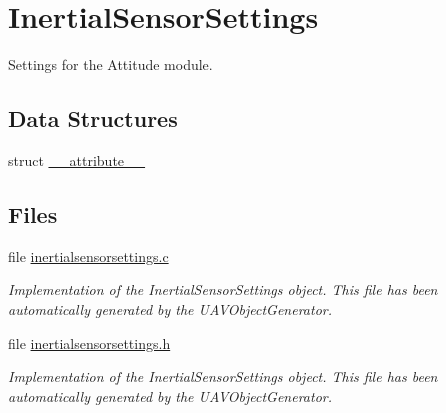 \hypertarget{group___inertial_sensor_settings}{\section{\-Inertial\-Sensor\-Settings}
\label{group___inertial_sensor_settings}
}


\-Settings for the \-Attitude module.  


\subsection*{\-Data \-Structures}
\begin{DoxyCompactItemize}
\item 
struct \hyperlink{struct____attribute____}{\-\_\-\-\_\-attribute\-\_\-\-\_\-}
\end{DoxyCompactItemize}
\subsection*{\-Files}
\begin{DoxyCompactItemize}
\item 
file \hyperlink{inertialsensorsettings_8c}{inertialsensorsettings.\-c}
\begin{DoxyCompactList}\small\item\em \-Implementation of the \-Inertial\-Sensor\-Settings object. \-This file has been automatically generated by the \-U\-A\-V\-Object\-Generator. \end{DoxyCompactList}\item 
file \hyperlink{inertialsensorsettings_8h}{inertialsensorsettings.\-h}
\begin{DoxyCompactList}\small\item\em \-Implementation of the \-Inertial\-Sensor\-Settings object. \-This file has been automatically generated by the \-U\-A\-V\-Object\-Generator. \end{DoxyCompactList}\end{DoxyCompactItemize}
